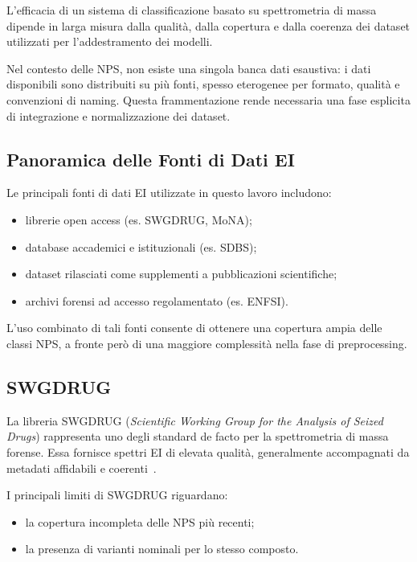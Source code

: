 L’efficacia di un sistema di classificazione basato su spettrometria di massa dipende in larga misura dalla qualità, dalla copertura e dalla coerenza dei dataset utilizzati per l’addestramento dei modelli.

Nel contesto delle NPS, non esiste una singola banca dati esaustiva: i dati disponibili sono distribuiti su più fonti, spesso eterogenee per formato, qualità e convenzioni di naming.
Questa frammentazione rende necessaria una fase esplicita di integrazione e normalizzazione dei dataset.

\subsection{Panoramica delle Fonti di Dati EI}
\label{subsec:ei_sources}

Le principali fonti di dati EI utilizzate in questo lavoro includono:
\begin{itemize}
	\item librerie open access (es. SWGDRUG, MoNA);
	\item database accademici e istituzionali (es. SDBS);
	\item dataset rilasciati come supplementi a pubblicazioni scientifiche;
	\item archivi forensi ad accesso regolamentato (es. ENFSI).
\end{itemize}

L’uso combinato di tali fonti consente di ottenere una copertura ampia delle classi NPS, a fronte però di una maggiore complessità nella fase di preprocessing.

\subsection{SWGDRUG}
\label{subsec:swgdrug}

La libreria SWGDRUG (\emph{Scientific Working Group for the Analysis of Seized Drugs}) rappresenta uno degli standard de facto per la spettrometria di massa forense.
Essa fornisce spettri EI di elevata qualità, generalmente accompagnati da metadati affidabili e coerenti~\cite{swgdrug}.

I principali limiti di SWGDRUG riguardano:
\begin{itemize}
	\item la copertura incompleta delle NPS più recenti;
	\item la presenza di varianti nominali per lo stesso composto.
\end{itemize}


